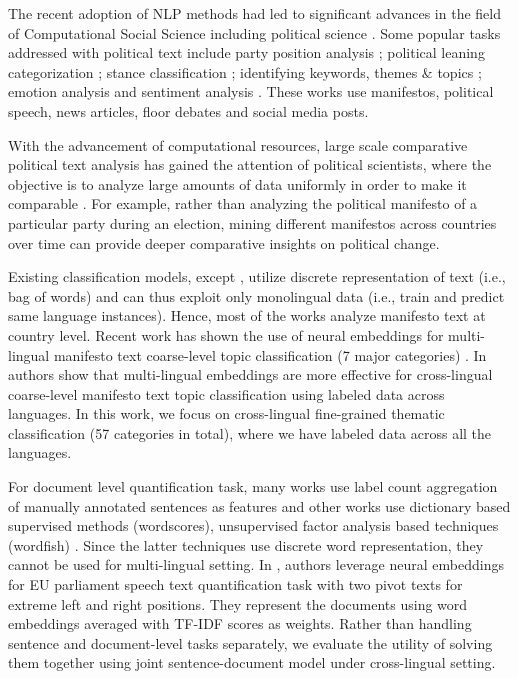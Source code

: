 \documentclass[11pt,a4paper]{article}
\begin{document}
The recent adoption of NLP methods had led to significant advances in the field of Computational Social Science \cite{lazer2009life} including political science \cite{grimmer2013text}. Some popular tasks addressed with political text include party position analysis \cite{biessmann2016automating};  political leaning categorization \cite{akoglu2014quantifying, zhou2011classifying}; stance classification \cite{sridhar2014collective}; identifying keywords, themes \& topics \cite{karan2016analysis, nallapati2004extraction, ding2011keyphrase}; emotion analysis \cite{rheault2016expressions} and sentiment analysis \cite{bakliwal2013sentiment}. These works use manifestos, political speech, news articles, floor debates and social media posts. 

With the advancement of computational resources, large scale comparative political text analysis has gained the attention of political scientists, where the objective is to analyze large amounts of data uniformly in order to make it comparable \cite{lucas2015computer}. For example, rather than analyzing the political manifesto of a particular party during an election, mining different manifestos across countries over time can provide deeper comparative insights on political change.

Existing classification models, except \cite{W17-2906}, utilize discrete representation of text (i.e., bag of words) and can thus exploit only monolingual data (i.e., train and predict same language instances). Hence, most of the works analyze manifesto text at country level. Recent work has shown the use of neural embeddings for multi-lingual manifesto text coarse-level topic classification (7 major categories) \cite{W17-2906}. In \cite{W17-2906} authors show that multi-lingual embeddings are more effective for cross-lingual coarse-level manifesto text topic classification using labeled data across languages. In this work, we focus on cross-lingual fine-grained thematic classification (57 categories in total), where we have labeled data across all the languages.

For document level quantification task, many works use label count aggregation of  manually annotated sentences as features \cite{lowe2011scaling, benoit2014putting} and other works use dictionary based supervised methods (wordscores), unsupervised factor analysis based techniques (wordfish) \cite{hjorth2015computers, 2017arXiv170704737B}. Since the latter techniques use discrete word representation, they cannot be used for multi-lingual setting. In \cite{EACL}, authors leverage neural embeddings for EU parliament speech text quantification task with two pivot texts for extreme left and right positions. They represent the documents using word embeddings averaged with TF-IDF scores as weights. Rather than handling sentence and document-level tasks separately, we evaluate the utility of solving them together using joint sentence-document model under cross-lingual setting.
\end{document}
